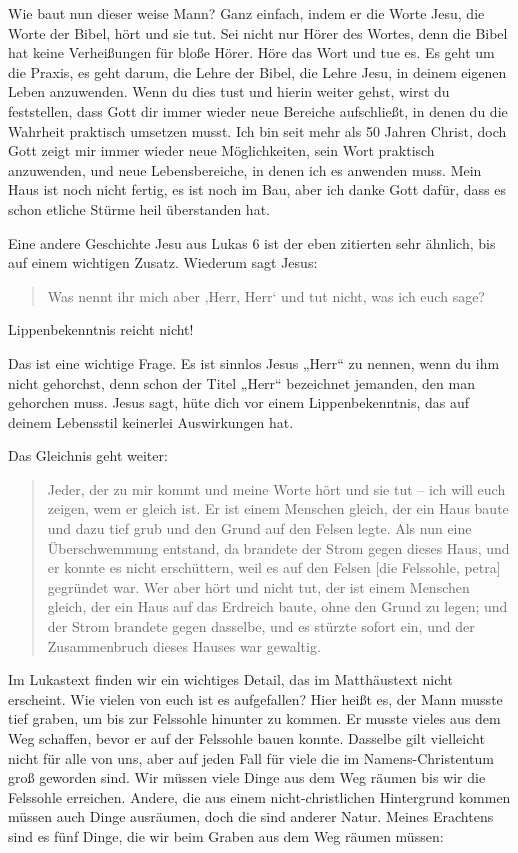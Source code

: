 Wie baut nun dieser weise Mann? 
Ganz einfach, indem er die Worte Jesu, die Worte der Bibel, hört und sie tut.
Sei nicht nur Hörer des Wortes, denn die Bibel hat keine Verheißungen für bloße Hörer.
Höre das Wort und tue es.
Es geht um die Praxis, es geht darum, die Lehre der Bibel, die Lehre Jesu, in deinem eigenen Leben anzuwenden. Wenn du dies tust und hierin weiter gehst, wirst du feststellen, dass Gott dir immer wieder neue Bereiche aufschließt, in denen du die Wahrheit praktisch umsetzen musst.
Ich bin seit mehr als 50 Jahren Christ, doch Gott zeigt mir immer wieder neue Möglichkeiten, sein Wort praktisch anzuwenden, und neue Lebensbereiche, in denen ich es anwenden muss.
Mein Haus ist noch nicht fertig, es ist noch im Bau, aber ich danke Gott dafür, dass es schon etliche Stürme heil überstanden hat.

Eine andere Geschichte Jesu aus Lukas 6 ist der eben zitierten sehr ähnlich, bis auf einem wichtigen Zusatz. Wiederum sagt Jesus:

\begin{quotation}
  Was nennt ihr mich aber ‚Herr, Herr‘ und tut nicht, was ich euch sage?
\end{quotation}

Lippenbekenntnis reicht nicht!

Das ist eine wichtige Frage. 
Es ist sinnlos Jesus „Herr“ zu nennen, wenn du ihm nicht gehorchst, denn schon der Titel „Herr“ bezeichnet jemanden, den man gehorchen muss. 
Jesus sagt, hüte dich vor einem Lippenbekenntnis, das auf deinem Lebensstil keinerlei Auswirkungen hat.

Das Gleichnis geht weiter:

\begin{quotation}
  Jeder, der zu mir kommt und meine Worte hört und sie tut – ich will euch zeigen, wem er gleich ist. Er ist einem Menschen gleich, der ein Haus baute und dazu tief grub und den Grund auf den Felsen legte. Als nun eine Überschwemmung entstand, da brandete der Strom gegen dieses Haus, und er konnte es nicht erschüttern, weil es auf den Felsen [die Felssohle, petra] gegründet war. Wer aber hört und nicht tut, der ist einem Menschen gleich, der ein Haus auf das Erdreich baute, ohne den Grund zu legen; und der Strom brandete gegen dasselbe, und es stürzte sofort ein, und der Zusammenbruch dieses Hauses war gewaltig.
\end{quotation}

Im Lukastext finden wir ein wichtiges Detail, das im Matthäustext nicht erscheint. Wie vielen von euch ist es aufgefallen?
Hier heißt es, der Mann musste tief graben, um bis zur Felssohle hinunter zu kommen.
Er musste vieles aus dem Weg schaffen, bevor er auf der Felssohle bauen konnte.
Dasselbe gilt vielleicht nicht für alle von uns, aber auf jeden Fall für viele die im Namens-Christentum groß geworden sind.
Wir müssen viele Dinge aus dem Weg räumen bis wir die Felssohle erreichen. 
Andere, die aus einem nicht-christlichen Hintergrund kommen müssen auch Dinge ausräumen, doch die sind anderer Natur.
Meines Erachtens sind es fünf Dinge, die wir beim Graben aus dem Weg räumen müssen:

